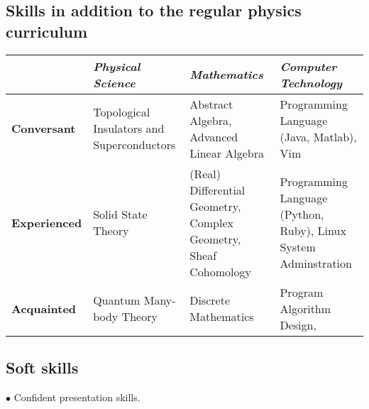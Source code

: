 \documentclass[letterpaper]{article}
\renewenvironment{itemize}{
  \begin{list}{}{
    \setlength{\leftmargin}{.5em}
  }
}{
  \end{list}
}
\begin{document}
\subsection*{Skills in addition to the regular physics curriculum}
\begin{table}[h]
    \centering
    \tabulinesep=1.2mm
    \begin{tabu}{  l X[l] X[l] X[l]  }
        &  \textit{Physical Science} & \textit{Mathematics} &
        \textit{Computer Technology} \\
    \hline
    \textbf{Conversant} 
    & Topological Insulators and Superconductors 
        & Abstract Algebra, Advanced Linear Algebra 
            & Programming Language (Java, Matlab), Vim \\

    \textbf{Experienced} 
    & Solid State Theory
        & (Real) Differential Geometry, Complex Geometry, Sheaf
        Cohomology 
            & Programming Language (Python, Ruby), Linux System
            Adminstration\\

    \textbf{Acquainted} 
    & Quantum Many-body Theory 
        & Discrete Mathematics 
            & Program Algorithm Design,  \\
    \bottomrule
    \end{tabu}
\end{table}
\subsection*{Soft skills}
\begin{itemize}
    \item $\bullet$ Confident presentation skills.
\end{itemize}

\end{document}
